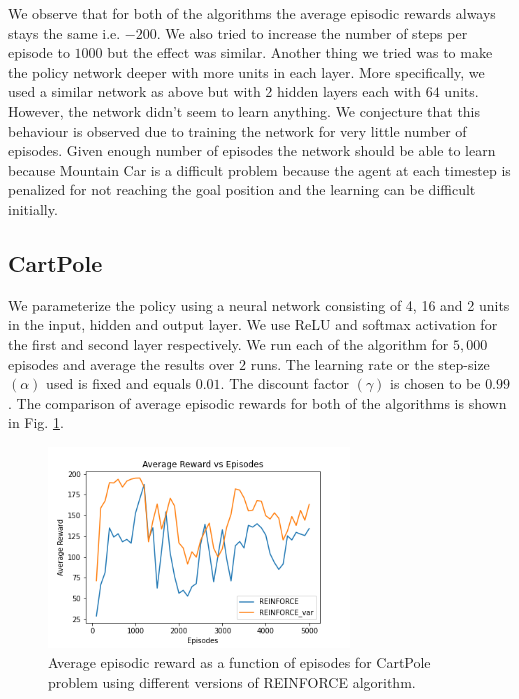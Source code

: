 \documentclass{article}
\begin{document}
    \noindent %
    We observe that for both of the algorithms the average episodic rewards always stays the same i.e. $-200$. We also tried to increase the number of steps per episode to
    $1000$ but the effect was similar. Another thing we tried was to make the policy network deeper with more units in each layer. More specifically, we used a similar
    network as above but with 2 hidden layers each with $64$ units. However, the network didn't seem to learn anything. We conjecture that this behaviour is observed 
    due to training the network for very little number of episodes. Given enough number of episodes the
    network should be able to learn because Mountain Car is a difficult problem because the agent at each timestep is penalized for not reaching the goal position and the
    learning can be difficult initially.

    \subsection{CartPole}
    We parameterize the policy using a neural network consisting of 4, 16 and 2 units in the input, hidden and output layer. We use ReLU and softmax activation for
    the first and second layer respectively. We run each of the algorithm for $5,000$ episodes and average the results over $2$ runs. 
    The learning rate or the step-size $(\alpha)$ used is fixed and equals $0.01$. The discount factor $(\gamma)$ is chosen to be $0.99$. The comparison of average 
    episodic rewards for both of the algorithms is shown in Fig. \ref{cartpole_reinforce}.
    
    \begin{figure}[H]
        \graphicspath{ {../Experiments/Linear_Function_Approximation/} }
        \begin{center}
        \includegraphics[width=8cm]{Cartpole_reinforce.png}
        \end{center}
        \caption{Average episodic reward as a function of episodes for CartPole problem using different versions of REINFORCE algorithm.}
        \label{cartpole_reinforce}
    \end{figure}
\end{document}
